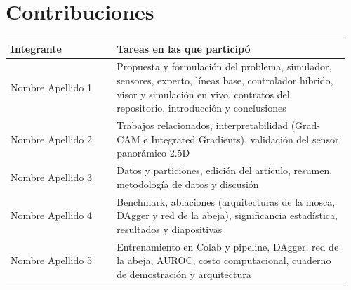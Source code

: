 \section*{Contribuciones}
\noindent\begin{tabular}{@{}p{0.30\linewidth}p{0.66\linewidth}@{}}
\toprule
Integrante & Tareas en las que participó \\
\midrule
Nombre Apellido 1 & Propuesta y formulación del problema, simulador, sensores,
experto, líneas base, controlador híbrido, visor y simulación en vivo, contratos del
repositorio, introducción y conclusiones \\
Nombre Apellido 2 & Trabajos relacionados, interpretabilidad (Grad-CAM e Integrated
Gradients), validación del sensor panorámico 2.5D \\
Nombre Apellido 3 & Datos y particiones, edición del artículo, resumen, metodología de datos
y discusión \\
Nombre Apellido 4 & Benchmark, ablaciones (arquitecturas de la mosca, DAgger y red de la
abeja), significancia estadística, resultados y diapositivas \\
Nombre Apellido 5 & Entrenamiento en Colab y pipeline, DAgger, red de la abeja, AUROC, costo
computacional, cuaderno de demostración y arquitectura \\
\bottomrule
\end{tabular}
